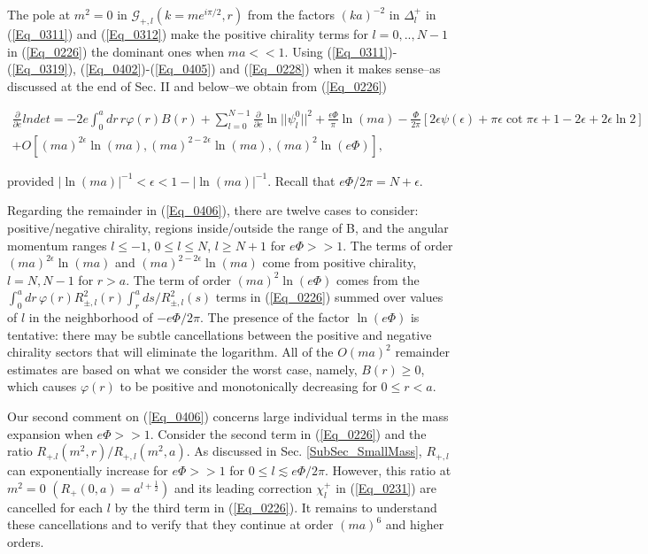 \documentclass[a4paper,twocolumn,showpacs,preprintnumbers,amsmath,amssymb]{revtex4}
\newcommand{\half}{\frac{1}{2}}
\newcommand{\pdo}[1]{\ensuremath{\frac{\partial }
        {\partial #1 }}}
\begin{document}
The pole at $m^2 = 0$ in $\mathcal{G}_{+,l} (k=me^{i\pi/2},r)$ from
the factors $(ka)^{-2}$ in $\Delta^{+}_l$ in (\ref{Eq_0311}) and
(\ref{Eq_0312}) make the positive chirality terms for $l = 0,..,N-1$
in (\ref{Eq_0226}) the dominant ones when $ma<<1$. Using
(\ref{Eq_0311})-(\ref{Eq_0319}), (\ref{Eq_0402})-(\ref{Eq_0405}) and
(\ref{Eq_0228}) when it makes sense--as discussed at the end of
Sec. II and below--we obtain from (\ref{Eq_0226})

\begin{widetext}
\begin{multline}
\label{Eq_0406}
\pdo{e} lndet = -2e \int^a_0 dr \, r \varphi(r) B(r)
  + \sum^{N-1}_{l=0} \pdo{e} \ln ||\psi^0_l||^2
  + \frac{\epsilon \Phi}{\pi} \ln(ma)
  - \frac{\Phi}{2\pi}[2\epsilon \psi(\epsilon)
    + \pi \epsilon \cot \pi \epsilon + 1 - 2 \epsilon + 2\epsilon \ln2]\\
  + O[(ma)^{2\epsilon}\ln(ma),(ma)^{2-2\epsilon}\ln(ma),(ma)^2\ln(e\Phi)],
\end{multline}
\end{widetext}

\noindent
provided $|\ln(ma)|^{-1} < \epsilon < 1 - |\ln(ma)|^{-1}$. Recall that
$e\Phi/2\pi = N + \epsilon$.

Regarding the remainder in (\ref{Eq_0406}), there are twelve cases to
consider: positive/negative chirality, regions inside/outside the
range of B, and the angular momentum ranges
$l \leq -1$, $0 \leq l \leq N$, $l \geq N + 1$ for $e\Phi >> 1$. The
terms of order $(ma)^{2\epsilon} \ln(ma)$ and
$(ma)^{2-2\epsilon}\ln(ma)$ come from positive chirality,
$l = N, N-1$ for $r > a$. The term of order $(ma)^2\ln(e\Phi)$ comes from the
$\int^a_0 dr \, \varphi(r) R^2_{\pm,l}(r) \int^a_r ds / R^2_{\pm,l}(s)$
terms in (\ref{Eq_0226}) summed over values of $l$ in the neighborhood
of $-e\Phi/2\pi$. The presence of the factor $\ln(e\Phi)$ is
tentative: there may be subtle cancellations between the positive and
negative chirality sectors that will eliminate the logarithm. All of
the $O(ma)^2$ remainder estimates are based on what we consider the
worst case, namely, $B(r) \geq 0$, which causes $\varphi(r)$ to be
positive and monotonically decreasing for $0 \leq r < a$.

Our second comment on (\ref{Eq_0406}) concerns large individual terms
in the mass expansion when $e\Phi >> 1$. Consider the second term in
(\ref{Eq_0226}) and the ratio $R_{+.l}(m^2,r)/R_{+,l}(m^2,a)$. As
discussed in Sec. \ref{SubSec_SmallMass}, $R_{+,l}$ can exponentially
increase for $e\Phi >> 1$ for $0 \leq l \lesssim e\Phi/2\pi$. However,
this ratio at $m^2 = 0$ $(R_{+}(0,a) = a^{l+\half})$ and its leading
correction $\chi^{+}_l$ in (\ref{Eq_0231}) are cancelled for each $l$
by the third term in (\ref{Eq_0226}). It remains to understand these
cancellations and to verify that they continue at order $(ma)^6$ and
higher orders.
\end{document}
